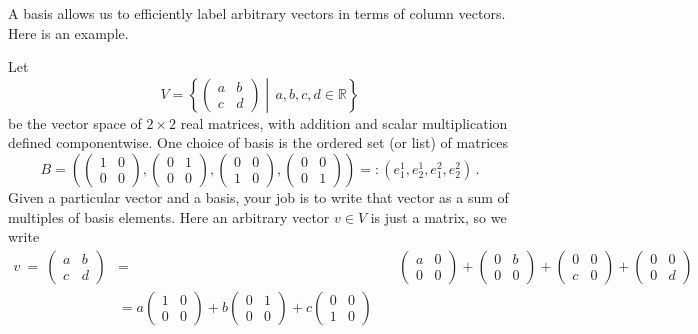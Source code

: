 \noindent
A basis allows us to efficiently label arbitrary vectors in terms of column vectors. Here is an  example.
\begin{example}
Let \[V=\left\{\begin{pmatrix}a&b\\c&d\end{pmatrix}\middle| \,a,b,c,d\in {\mathbb R}\right\}\] be the vector space of $2\times 2$ real matrices,
with addition and scalar multiplication defined componentwise. 
One choice of basis is the ordered set (or list) of matrices
\[B=\left(\begin{pmatrix}1&0\\0&0\end{pmatrix},\begin{pmatrix}0&1\\0&0\end{pmatrix},\begin{pmatrix}0&0\\ 1&0\end{pmatrix},\begin{pmatrix}0&0\\ 0&1\end{pmatrix}\right)=:(e_1^1,e_2^1,e^2_1,e^2_2)\, .\] 
Given a particular vector and a basis, your job is to write that vector as a sum of multiples of basis elements. Here
an arbitrary vector $v\in V$ is just a matrix, so we write
\begin{align*}
v\ =\ \begin{pmatrix}a&b\\c&d\end{pmatrix}&=&\quad\!\! \begin{pmatrix}a&0\\0&0\end{pmatrix}+\begin{pmatrix}0&b\\0&0\end{pmatrix}+\begin{pmatrix}0&0\\ c&0\end{pmatrix}+\begin{pmatrix}0&0\\0&d\end{pmatrix}\\[1mm]
&=a\begin{pmatrix}1&0\\0&0\end{pmatrix}+b\begin{pmatrix}0&1\\0&0\end{pmatrix}+c\begin{pmatrix}0&0\\ 1&0\end{pmatrix}

\end{align*}
\end{example}
